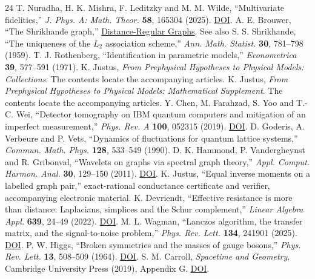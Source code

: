 \documentclass[11pt,letterpaper]{article}
\begin{document}
\begin{thebibliography}{24}\setlength{\itemsep}{1.8pt}
 T. Nuradha, H. K. Mishra, F. Leditzky and M. M. Wilde, “Multivariate fidelities,” \textit{J. Phys. A: Math. Theor.} \textbf{58}, 165304 (2025). \href{https://doi.org/10.1088/1751-8121/adc645}{DOI}.
 A. E. Brouwer, “The Shrikhande graph,” \href{https://aeb.win.tue.nl/drg/graphs/Shrikhande.html}{Distance-Regular Graphs}. See also S. S. Shrikhande, “The uniqueness of the $L_2$ association scheme,” \textit{Ann. Math. Statist.} \textbf{30}, 781–798 (1959).
 T. J. Rothenberg, “Identification in parametric models,” \textit{Econometrica} \textbf{39}, 577–591 (1971).
 K. Justus, \textit{From Prephysical Hypotheses to Physical Models: Collections}. The contents locate the accompanying articles.
 K. Justus, \textit{From Prephysical Hypotheses to Physical Models: Mathematical Supplement}. The contents locate the accompanying articles.
 Y. Chen, M. Farahzad, S. Yoo and T.-C. Wei, “Detector tomography on IBM quantum computers and mitigation of an imperfect measurement,” \textit{Phys. Rev. A} \textbf{100}, 052315 (2019). \href{https://doi.org/10.1103/PhysRevA.100.052315}{DOI}.
 D. Goderis, A. Verbeure and P. Vets, “Dynamics of fluctuations for quantum lattice systems,” \textit{Commun. Math. Phys.} \textbf{128}, 533–549 (1990).
 D. K. Hammond, P. Vandergheynst and R. Gribonval, “Wavelets on graphs via spectral graph theory,” \textit{Appl. Comput. Harmon. Anal.} \textbf{30}, 129–150 (2011). \href{https://doi.org/10.1016/j.acha.2010.04.005}{DOI}.
 K. Justus, “Equal inverse moments on a labelled graph pair,” exact-rational conductance certificate and verifier, accompanying electronic material.
 K. Devriendt, “Effective resistance is more than distance: Laplacians, simplices and the Schur complement,” \textit{Linear Algebra Appl.} \textbf{639}, 24–49 (2022). \href{https://doi.org/10.1016/j.laa.2022.01.002}{DOI}.
 M. L. Wagman, “Lanczos algorithm, the transfer matrix, and the signal-to-noise problem,” \textit{Phys. Rev. Lett.} \textbf{134}, 241901 (2025). \href{https://doi.org/10.1103/pcvc-734h}{DOI}.
 P. W. Higgs, “Broken symmetries and the masses of gauge bosons,” \textit{Phys. Rev. Lett.} \textbf{13}, 508–509 (1964). \href{https://doi.org/10.1103/PhysRevLett.13.508}{DOI}.
 S. M. Carroll, \textit{Spacetime and Geometry}, Cambridge University Press (2019), Appendix G. \href{https://doi.org/10.1017/9781108770385}{DOI}.

\end{thebibliography}
\end{document}
